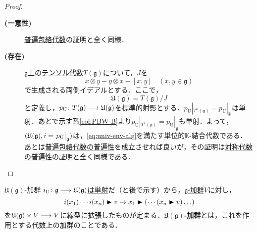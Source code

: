 \documentclass[rep_main]{subfiles}
\begin{document}
\begin{proof}
	\begin{description}
		\item[\textbf{(一意性)}] \hyperref[def:tensor-alg]{普遍包絡代数}の証明と全く同様．
		\item[\textbf{(存在)}] $\mathfrak{g}$上の\hyperref[def:tensor-alg]{テンソル代数}$T(\mathfrak{g})$について，$J$を
		\begin{equation}
			\label{eq:univ-env-alg-J}
			x \otimes y - y \otimes x - [x, y]\quad  (x, y \in \mathfrak{g})
		\end{equation}
		で生成される両側イデアルとする．ここで，
		\begin{equation}
			\mathfrak{U}(\mathfrak{g}) = T(\mathfrak{g}) / J
		\end{equation}
		と定義し，$p_\text{U} \colon T(\mathfrak{g}) \longrightarrow \mathfrak{U}(\mathfrak{g})$を標準的射影とする．$p_\text{U}|_{T^0(\mathfrak{g})} = p_\text{U}|_\mathbb{K}$は単射．あとで示す系\ref{col:PBW-B}より$p_\text{U}|_{T^1(\mathfrak{g})} = p_\text{U}|_\mathfrak{g}$も単射．よって，$(\mathfrak{U}(\mathfrak{g}), i = \eval{p_\text{U}}_\mathfrak{g})$は，\eqref{eq:univ-env-alg}を満たす単位的$\mathbb{K}$-結合代数である．\\
		あとは\hyperref[def:univ-env-alg]{普遍包絡代数の普遍性}を成立させれば良いが，その証明は\hyperref[sym-alg-univ]{対称代数の普遍性}の証明と全く同様である．
	\end{description}
\end{proof}
\begin{mydef}[label=def:univ-env-alg-module]{$\mathfrak{U}(\mathfrak{g})$-加群}
	\hyperref[col:PBW-C]{$i_\text{U}\colon \mathfrak{g} \longrightarrow \mathfrak{U}(\mathfrak{g})$は単射}だ（と後で示す）から，\hyperref[ax:g-module]{$\mathfrak{g}$-加群}$V$に対し，
	\begin{equation}
		i(x_1) \cdots i(x_n) \blacktriangleright v \mapsto x_1 \blacktriangleright ( \cdots (x_n \blacktriangleright v)\ldots)
	\end{equation}
	を$\mathfrak{U}(\mathfrak{g}) \times V \longrightarrow V$に線型に拡張したものが定まる．\textbf{$\mathfrak{U}(\mathfrak{g})$-加群}とは，これを作用とする代数上の加群のことである．
\end{mydef}
\end{document}
